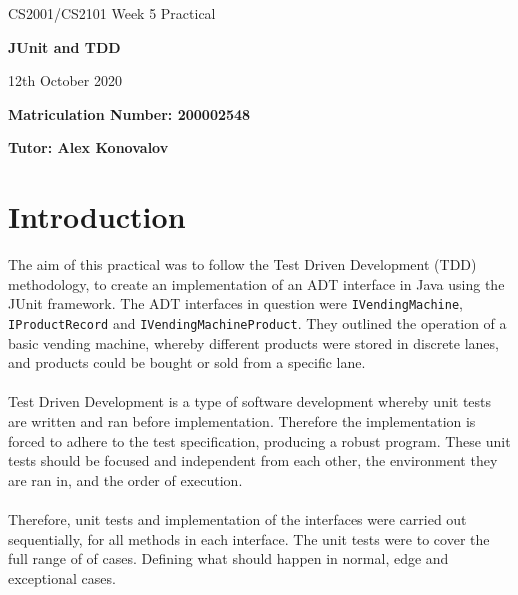 \documentclass{article}
\begin{document}
\nocite{*}

\begin{center}
\Huge 
CS2001/CS2101 Week 5 Practical

\vspace{0.5cm}

\textbf{JUnit and TDD}

\vspace{1cm}
\LARGE
12th October 2020

\large
\vspace{1.5cm}

\textbf{Matriculation Number: 200002548}

\vspace{0.5cm}

\textbf{Tutor: Alex Konovalov}

\end{center}

\vspace*{3cm}

\tableofcontents

\newpage
\section{Introduction}
The aim of this practical was to follow the Test Driven Development (TDD) methodology, to create an implementation of an ADT interface in Java using the JUnit framework. The ADT interfaces in question were \verb+IVendingMachine+, \verb+IProductRecord+ and \verb+IVendingMachineProduct+. They outlined the operation of a basic vending machine, whereby different products were stored in discrete lanes, and products could be bought or sold from a specific lane. \\ \\ \noindent Test Driven Development is a type of software development whereby unit tests are written and ran before implementation. Therefore the implementation is forced to adhere to the test specification, producing a robust program. These unit tests should be focused and independent from each other, the environment they are ran in, and the order of execution. \\ \\ \noindent Therefore, unit tests and implementation of the interfaces were carried out sequentially, for all methods in each interface. The unit tests were to cover the full range of of cases. Defining what should happen in normal, edge and exceptional cases.
\noindent
\end{document}
